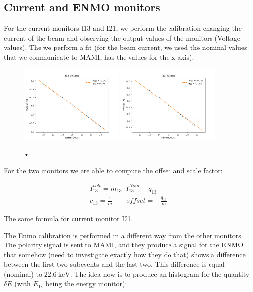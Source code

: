 \subsection{Current and ENMO monitors}

For the current monitors I13 and I21, we perform the calibration changing the current of the beam and observing the output values of the monitors (Voltage values). The we perform a fit (for the beam current, we used the nominal values that we communicate to MAMI, has the values for the x-axis).

\begin{figure}[hbtp]
\centering
\includegraphics[width = 0.45\textwidth]{Analysis/I13_Calibration.png}
\includegraphics[width = 0.45\textwidth]{Analysis/I21_Calibration.png} 
\caption{•}
\end{figure}

For the two monitors we are able to compute the offset and scale factor:

\begin{equation}
\begin{split}
I^{volt}_{13} = m_{13} \cdot I^{Nom}_{13} + q_{13}\\
c_{13} = \frac{1}{m} \qquad offset = -\frac{q_{13}}{m}
\end{split}
\end{equation}

The same formula for current monitor I21.

The Enmo calibration is performed in a different way from the other monitors. The polarity signal is sent to MAMI, and they produce a signal for the ENMO that somehow (need to investigate exactly how they do that) shows a difference between the first two subevents and the last two. This difference is equal (nominal) to $\SI{22.6}{\kilo \electronvolt}$. The idea now is to produce an histogram for the quantity $\delta E$ (with $E_{18}$ being the energy monitor):

